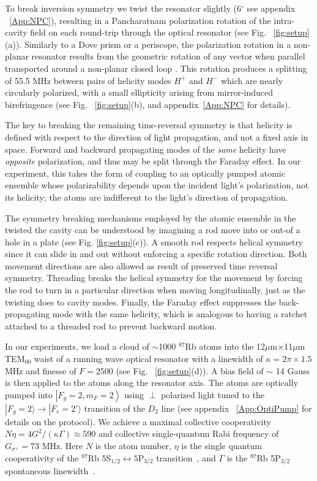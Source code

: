 \documentclass[aps,pra,twocolumn,groupedaddress,10pt,showpacs]{revtex4-1}
\begin{document}
To break inversion symmetry we twist the resonator slightly (6$^\circ$ see appendix ~\ref{App:NPC}), resulting in a Pancharatnam polarization rotation of the intra-cavity field on each round-trip through the optical resonator (see Fig. ~\ref{fig:setup}(a)). Similarly to a Dove prism or a periscope, the polarization rotation in a non-planar resonator results from the geometric rotation of any vector when parallel transported around a non-planar closed loop \cite{sommer2016engineering}. This rotation produces a splitting of 55.5 MHz between pairs of helicity modes $H^+$ and $H^-$ which are nearly circularly polarized, with a small ellipticity arising from mirror-induced birefringence (see Fig. ~\ref{fig:setup}(b), and appendix~\ref{App:NPC} for details).

The key to breaking the remaining time-reversal symmetry is that helicity is defined with respect to the direction of light propagation, and not a fixed axis in space. Forward and backward propagating modes of the \emph{same} helicity have \emph{opposite} polarization, and thus may be split through the Faraday effect. In our experiment, this takes the form of coupling to an optically pumped atomic ensemble whose polarizability depends upon the incident light's polarization, not its helicity; the atoms are indifferent to the light's direction of propagation.

The symmetry breaking mechanisms employed by the atomic ensemble in the twisted the cavity can be understood by imagining a rod move into or out-of a hole in a plate (see Fig. \ref{fig:setup}(c)). A smooth rod respects  helical symmetry since it can slide in and out without enforcing a specific rotation direction. Both movement directions are also allowed as result of preserved time reversal symmetry. Threading breaks the helical symmetry for the movement by forcing the rod to turn in a particular direction when moving longitudinally, just as the twisting does to cavity modes. Finally, the Faraday effect suppresses the back-propagating mode with the same helicity, which is analogous to having a ratchet attached to a threaded rod to prevent backward motion. 

In our experiments, we load a cloud of $\sim$1000 $^{87}$Rb atoms into the 12$\mu$m$\times$11$\mu$m TEM$_{00}$ waist of a running wave optical resonator with a linewidth of $\kappa=2\pi\times 1.5$ MHz and finesse of $F=2500$ (see Fig. ~\ref{fig:setup}(d)). A bias field of $\sim$ 14 Gauss is then applied to the atoms along the resonator axis. The atoms are optically pumped into $\left|F_g=2, m_F=2\right\rangle$ using $\perp$ polarized light tuned to the $|F_g=2\rangle\rightarrow |F_e=2'\rangle$ transition of the $D_2$ line (see appendix ~\ref{App:OptiPump} for details on the protocol). We achieve a maximal collective cooperativity $N\eta = 4 G^2/(\kappa \Gamma) \approx 590$ and collective single-quantum Rabi frequency of $G_{\sigma^+}=73$ MHz. Here $N$ is the atom number, $\eta$ is the single quantum cooperativity of the $^{87}$Rb $5$S$_{1/2}\leftrightarrow 5$P$_{3/2}$ transition~\cite{TanjiCQED2011}, and $\Gamma$ is the $^{87}$Rb 5P$_{3/2}$ spontaneous linewidth~\cite{steck2001rubidium}.
\end{document}
